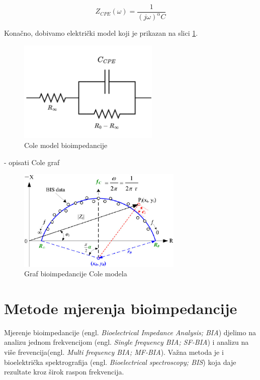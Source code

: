 \documentclass[../diplomski_rad.tex]{subfiles}
\begin{document}
\begin{equation}
    \label{jed:prvajednadzba}
    Z_{CPE}(\omega) = \frac{1}{(j\omega)^{\alpha}C}
\end{equation} 

Konačno, dobivamo električki model koji je prikazan na slici \ref{slk:cole_model}.
\begin{figure}[htb]
    \centering
    \includegraphics[width=0.6\textwidth]{Figures/cole_model.png} 
    \caption{Cole model bioimpedancije}
    \label{slk:cole_model}
\end{figure}

- opisati Cole graf

\begin{figure}[htb]
    \centering
    \includegraphics[width=0.7\textwidth]{Figures/cole_plot.png} 
    \caption{Graf bioimpedancije Cole modela \cite{Yang_2013}}
    \label{slk:cole_graf}
\end{figure}

\section{Metode mjerenja bioimpedancije}

Mjerenje bioimpedancije (engl. \textit{Bioelectrical Impedance Analysis; BIA})  djelimo na 
analizu jednom frekvencijom (engl. \textit{Single frequency BIA; SF-BIA}) 
i analizu na više frevencija(engl. \textit{Multi frequency BIA; MF-BIA}). 
Važna metoda je i bioelektrička spektrografija (engl. \textit{Bioelectrical spectroscopy; BIS}) 
koja daje rezultate kroz širok raspon frekvencija. 
\end{document}
